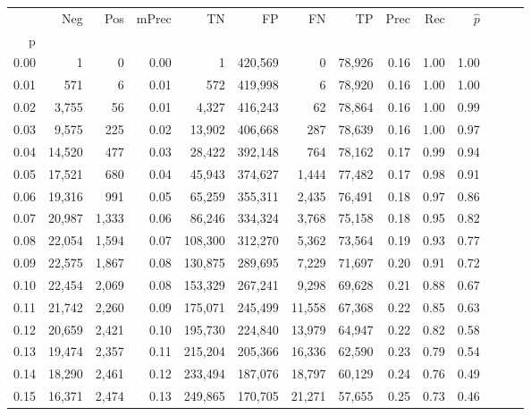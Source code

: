 \begin{tabular}{rrrrrrrrrrrrrr}
\toprule
{} &     Neg &    Pos & mPrec &       TN &       FP &      FN &      TP &  Prec &   Rec & $\hat{p}$ \\
p    &         &        &       &          &          &         &         &       &       &           \\
\midrule
0.00 &       1 &      0 &  0.00 &        1 &  420,569 &       0 &  78,926 &  0.16 &  1.00 &      1.00 \\
0.01 &     571 &      6 &  0.01 &      572 &  419,998 &       6 &  78,920 &  0.16 &  1.00 &      1.00 \\
0.02 &   3,755 &     56 &  0.01 &    4,327 &  416,243 &      62 &  78,864 &  0.16 &  1.00 &      0.99 \\
0.03 &   9,575 &    225 &  0.02 &   13,902 &  406,668 &     287 &  78,639 &  0.16 &  1.00 &      0.97 \\
0.04 &  14,520 &    477 &  0.03 &   28,422 &  392,148 &     764 &  78,162 &  0.17 &  0.99 &      0.94 \\
0.05 &  17,521 &    680 &  0.04 &   45,943 &  374,627 &   1,444 &  77,482 &  0.17 &  0.98 &      0.91 \\
0.06 &  19,316 &    991 &  0.05 &   65,259 &  355,311 &   2,435 &  76,491 &  0.18 &  0.97 &      0.86 \\
0.07 &  20,987 &  1,333 &  0.06 &   86,246 &  334,324 &   3,768 &  75,158 &  0.18 &  0.95 &      0.82 \\
0.08 &  22,054 &  1,594 &  0.07 &  108,300 &  312,270 &   5,362 &  73,564 &  0.19 &  0.93 &      0.77 \\
0.09 &  22,575 &  1,867 &  0.08 &  130,875 &  289,695 &   7,229 &  71,697 &  0.20 &  0.91 &      0.72 \\
0.10 &  22,454 &  2,069 &  0.08 &  153,329 &  267,241 &   9,298 &  69,628 &  0.21 &  0.88 &      0.67 \\
0.11 &  21,742 &  2,260 &  0.09 &  175,071 &  245,499 &  11,558 &  67,368 &  0.22 &  0.85 &      0.63 \\
0.12 &  20,659 &  2,421 &  0.10 &  195,730 &  224,840 &  13,979 &  64,947 &  0.22 &  0.82 &      0.58 \\
0.13 &  19,474 &  2,357 &  0.11 &  215,204 &  205,366 &  16,336 &  62,590 &  0.23 &  0.79 &      0.54 \\
0.14 &  18,290 &  2,461 &  0.12 &  233,494 &  187,076 &  18,797 &  60,129 &  0.24 &  0.76 &      0.49 \\
0.15 &  16,371 &  2,474 &  0.13 &  249,865 &  170,705 &  21,271 &  57,655 &  0.25 &  0.73 &      0.46 \\

\end{tabular}
